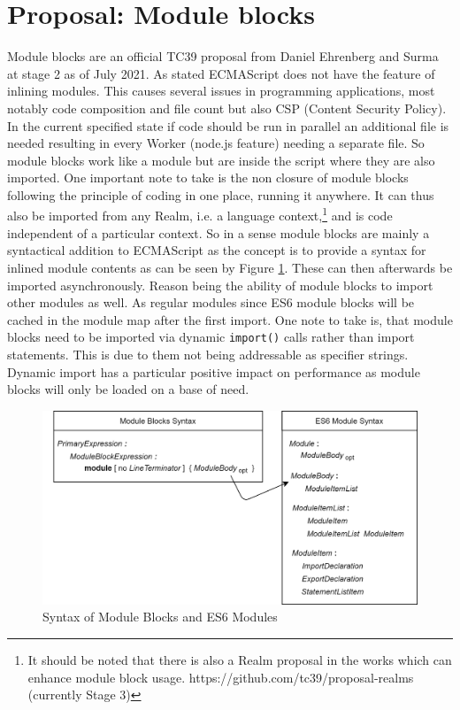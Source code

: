 \section{Proposal: Module blocks}
Module blocks are an official TC39 proposal from Daniel Ehrenberg and Surma at stage 2 as of July 2021. \cite{gitMB} As stated ECMAScript does not have the feature of inlining modules. This causes several issues in programming applications, most notably code composition and file count but also CSP (Content Security Policy). In the current specified state if code should be run in parallel an additional file is needed resulting in every Worker (node.js feature) \cite{nodejs} needing a separate file. So module blocks work like a module but are inside the script where they are also imported. One important note to take is the non closure of module blocks following the principle of coding in one place, running it anywhere. It can thus also be imported from any Realm, i.e. a language context,\footnote{It should be noted that there is also a Realm proposal in the works which can enhance module block usage. https://github.com/tc39/proposal-realms (currently Stage 3)} and is code independent of a particular context. So in a sense module blocks are mainly a syntactical addition to ECMAScript as the concept is to provide a syntax for inlined module contents as can be seen by Figure \ref{fig:mbSyn}. \cite{gitMB, ecma} These can then afterwards be imported asynchronously. Reason being the ability of module blocks to import other modules as well. As regular modules since ES6 module blocks will be cached in the module map after the first import. One note to take is, that module blocks need to be imported via dynamic \texttt{import()} calls rather than import statements. This is due to them not being addressable as specifier strings. Dynamic import  has a particular positive impact on performance as module blocks will only be loaded on a base of need.

\begin{figure}[h!]
    \centering
    \includegraphics[scale=0.165]{figures/ModuleSyntax.png}
    \caption{Syntax of Module Blocks and ES6 Modules}
    \label{fig:mbSyn}
\end{figure}

